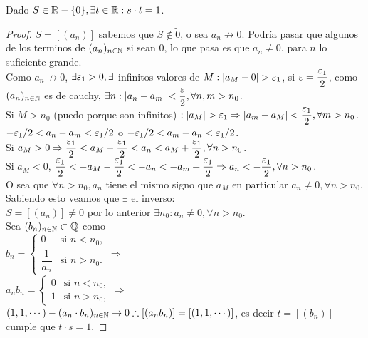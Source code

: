 \begin{theorem}
  Dado $S \in \mathbb{R} - \{0\}, \exists t \in \mathbb{R} : s \cdot t = 1$.
  \begin{proof}
    $S = [(a_n)]$ sabemos que $S \notin \tilde{0}$, o sea $a_n \not \to 0$. Podría pasar que algunos de los terminos de $(a_n)_{n \in \mathbb{N}}$ si sean $0$, lo que pasa es que $a_n \neq 0.$ para $n$ lo suficiente grande. \\
    Como $a_n \not \to 0$, $\exists \varepsilon_1 > 0, \exists$ infinitos valores de $M: |a_M - 0| > \varepsilon_1$, si $\varepsilon = \dfrac{\varepsilon_1}{2}$, como $(a_n)_{n \in \mathbb{N}}$ es de cauchy, $\exists n : |a_n - a_m| < \dfrac{\varepsilon}{2}, \forall n, m > n_0$. \\
    Si $M > n_0$ (puedo porque son infinitos) $: |a_M| > \varepsilon_1 \Rightarrow |a_m - a_M| < \dfrac{\varepsilon_1}{2}, \forall m > n_0$. \\
    $-\varepsilon_1/2 < a_n - a_m < \varepsilon_1 / 2$ o $-\varepsilon_1 / 2 < a_m - a_n < \varepsilon_1 / 2$. \\
    Si $a_M > 0 \Rightarrow \dfrac{\varepsilon_1}{2} < a_M - \dfrac{\varepsilon_1}{2} < a_n < a_M + \dfrac{\varepsilon_1}{2}, \forall n > n_0$. \\
    Si $a_M < 0$, $\dfrac{\varepsilon_1}{2} < -a_M - \dfrac{\varepsilon_1}{2} < -a_n<-a_m+ \dfrac{\varepsilon_1}{2} \Rightarrow a_n < -\dfrac{\varepsilon_1}{2}, \forall n > n_0$. \\
    O sea que $\forall n > n_0, a_n$ tiene el mismo signo que $a_M$ en particular $a_n \neq 0, \forall n > n_0$. \\
    Sabiendo esto veamos que $\exists$ el inverso: \\
    $S = [(a_n)] \neq 0$ por lo anterior $\exists n_0 : a_n \neq 0, \forall n > n_0$. \\
    Sea $(b_n)_{n \in \mathbb{N}} \subset \mathbb{Q}$ como \\
    $b_n = \begin{cases}
        0              & \text{si } n < n_0, \\
        \dfrac{1}{a_n} & \text{si } n > n_0.
      \end{cases} \Rightarrow$ \\

    $a_n b_n = \begin{cases}
        0 & \text{si } n < n_0, \\
        1 & \text{si } n > n_0,
      \end{cases} \Rightarrow$ \\

    $(1, 1, \cdots) - (a_n \cdot b_n)_{n \in \mathbb{N}} \to 0 \therefore [(a_n b_n)] = [(1, 1, \cdots)]$, es decir $t = [(b_n)]$ cumple que $t \cdot s = 1$.
  \end{proof}
\end{theorem}

